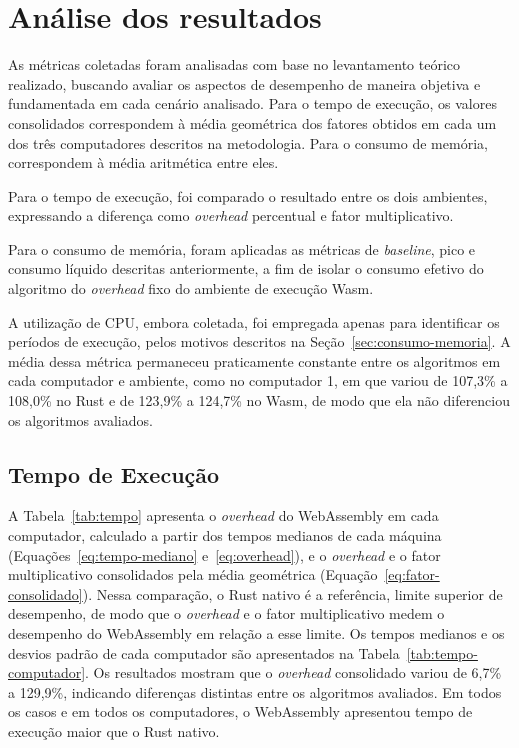 \chapter{Análise dos resultados}
\label{cap:resultados}

As métricas coletadas foram analisadas com base no levantamento teórico realizado, buscando avaliar os aspectos de desempenho de maneira objetiva e fundamentada em cada cenário analisado. Para o tempo de execução, os valores consolidados correspondem à média geométrica dos fatores obtidos em cada um dos três computadores descritos na metodologia. Para o consumo de memória, correspondem à média aritmética entre eles.

Para o tempo de execução, foi comparado o resultado entre os dois ambientes, expressando a diferença como \emph{overhead} percentual e fator multiplicativo.

Para o consumo de memória, foram aplicadas as métricas de \emph{baseline}, pico e consumo líquido descritas anteriormente, a fim de isolar o consumo efetivo do algoritmo do \emph{overhead} fixo do ambiente de execução Wasm.

A utilização de CPU, embora coletada, foi empregada apenas para identificar os períodos de execução, pelos motivos descritos na Seção~\ref{sec:consumo-memoria}. A média dessa métrica permaneceu praticamente constante entre os algoritmos em cada computador e ambiente, como no computador 1, em que variou de 107,3\% a 108,0\% no Rust e de 123,9\% a 124,7\% no Wasm, de modo que ela não diferenciou os algoritmos avaliados.

\section{Tempo de Execução}

A Tabela~\ref{tab:tempo} apresenta o \emph{overhead} do WebAssembly em cada computador, calculado a partir dos tempos medianos de cada máquina (Equações~\eqref{eq:tempo-mediano} e~\eqref{eq:overhead}), e o \emph{overhead} e o fator multiplicativo consolidados pela média geométrica (Equação~\eqref{eq:fator-consolidado}). Nessa comparação, o Rust nativo é a referência, limite superior de desempenho, de modo que o \emph{overhead} e o fator multiplicativo medem o desempenho do WebAssembly em relação a esse limite. Os tempos medianos e os desvios padrão de cada computador são apresentados na Tabela~\ref{tab:tempo-computador}. Os resultados mostram que o \emph{overhead} consolidado variou de 6,7\% a 129,9\%, indicando diferenças distintas entre os algoritmos avaliados. Em todos os casos e em todos os computadores, o WebAssembly apresentou tempo de execução maior que o Rust nativo.

